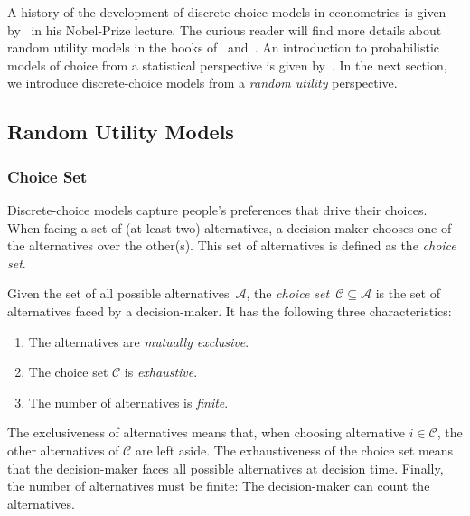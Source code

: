 A history of the development of discrete-choice models in econometrics is given by~\citet{mcfadden2001economic} in his Nobel-Prize lecture.
The curious reader will find more details about random utility models in the books of~\citet[Chapter~1]{train2009discrete} and~\citet[Chapter~3]{hensher2005applied}.
An introduction to probabilistic models of choice from a statistical perspective is given by~\citet[Chapter~1]{maystre2018efficient}.
In the next section, we introduce discrete-choice models from a \emph{random utility} perspective.

\subsection{Random Utility Models}

\subsubsection{Choice Set}
Discrete-choice models capture people's preferences that drive their choices.
When facing a set of (at least two) alternatives, a decision-maker chooses one of the alternatives over the other(s).
This set of alternatives is defined as the \emph{choice set}.

\begin{definition}
	Given the set of all possible alternatives~$\mathcal{A}$, the \emph{choice set}~$\mathcal{C} \subseteq \mathcal{A}$ is the set of alternatives faced by a decision-maker.
	It has the following three characteristics:
	\begin{enumerate}
		\item The alternatives are \emph{mutually exclusive}.
		\item The choice set $\mathcal{C}$ is \emph{exhaustive}.
		\item The number of alternatives is \emph{finite}.
	\end{enumerate}
\end{definition}

The exclusiveness of alternatives means that, when choosing alternative $i \in \mathcal{C}$, the other alternatives of $\mathcal{C}$ are left aside.
The exhaustiveness of the choice set means that the decision-maker faces all possible alternatives at decision time.
Finally, the number of alternatives must be finite:
The decision-maker can count the alternatives.

